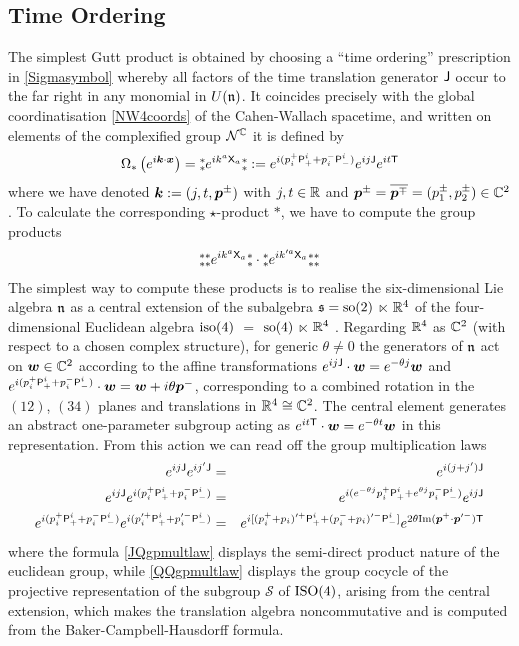 \subsection{Time Ordering}
\label{TOP}

The simplest Gutt product is obtained by choosing a ``time ordering''
prescription in \eqref{Sigmasymbol} whereby all factors of the time translation
generator ${\sf J}$ occur to the far right in any monomial in $U({\mathfrak n})$. It coincides
precisely with the global coordinatisation \eqref{NW4coords} of the
Cahen-Wallach spacetime, and written on elements of the complexified group
$\mathcal{N}^{\mathbb C}$ it is defined by
\begin{equation}
  \label{eq:time:defn}
  \Omega_*\left( e^{ i{{\boldsymbol {k} }}\cdot{{\boldsymbol {x} }}}\right)=
  \mbox{$\substack{\ast\\\ast}$}  e^{ i k^a {\sf X}_a} \mbox{$\substack{\ast\\\ast}$}:= e^{ i(p_i^+ {\sf P}^i_+
    +p_i^- {\sf P}^i_-)}  e^{ i j {\sf J}}  e^{ i t {\sf T}}
\end{equation}
where we have denoted ${{\boldsymbol {k} }}:=(j,t,{{\boldsymbol {p} }}^\pm)$ with $j,t\in{\mathbb R}$ and
${{\boldsymbol {p} }}^\pm=\overline{{{\boldsymbol {p} }}^\mp}=(p_1^\pm,p_2^\pm)\in{\mathbb C}^2$. To calculate the
corresponding $\star$-product $*$, we have to compute the group products
\begin{eqnarray}
  \label{TOgpprods}
  \mbox{$\substack{\ast\\\ast}$}  \mbox{$\substack{\ast\\\ast}$}  e^{ i k^a {\sf X}_a} \mbox{$\substack{\ast\\\ast}$}\cdot\mbox{$\substack{\ast\\\ast}$}  e^{ i k^{\prime a} {\sf X}_a}
  \mbox{$\substack{\ast\\\ast}$}  \mbox{$\substack{\ast\\\ast}$}
\end{eqnarray}
The simplest way to compute these products is to realise the six-dimensional Lie
algebra ${\mathfrak n}$ as a central extension of the subalgebra ${\mathfrak s}={\rm so}(2)$
$\ltimes$ ${\mathbb R}^4$ of the four-di\-mensional Euclidean algebra ${\rm iso}(4)$ $=$
${\rm so}(4)$ $\ltimes$ ${\mathbb R}^4$ \cite{SF1,FS1}. Regarding ${\mathbb R}^4$ as ${\mathbb C}^2$ (with
respect to a chosen complex structure), for generic $\theta\neq0$ the generators
of ${\mathfrak n}$ act on ${{\boldsymbol {w} }}\in{\mathbb C}^2$ according to the affine transformations $ e^{ i j
  {\sf J}}\cdot{{\boldsymbol {w} }}= e^{-\theta j} {{\boldsymbol {w} }}$ and $ e^{ i(p_i^+ {\sf P}^i_++p_i^-
  {\sf P}^i_-)}\cdot{{\boldsymbol {w} }}={{\boldsymbol {w} }}+ i\theta {{\boldsymbol {p} }}^-$, corresponding to a combined rotation in
the $(12)$, $(34)$ planes and translations in ${\mathbb R}^4\cong{\mathbb C}^2$. The central
element generates an abstract one-parameter subgroup acting as $ e^{ i t
  {\sf T}}\cdot{{\boldsymbol {w} }}= e^{-\theta t} {{\boldsymbol {w} }}$ in this representation. From this action we
can read off the group multiplication laws
\begin{eqnarray}
  \label{JJgpmultlaw}
  e^{ i j {\sf J}}  e^{ i j' {\sf J}}&=& e^{ i(j+j' ) {\sf J}}
  \\\label{JQgpmultlaw}
  e^{ i j {\sf J}}  e^{ i(p_i^+ {\sf P}^i_++p_i^- {\sf P}^i_-)}
  &=& e^{ i(  e^{-\theta j} p_i^+ {\sf P}^i_+ +e^{\theta j} p_i^- {\sf P}^i_-)}e^{ ij{\sf J}}
  \\\label{QQgpmultlaw}
  e^{ i(p_i^+ {\sf P}^i_++p_i^- {\sf P}^i_-)}e^{ i(p_i^{\prime +} {\sf P}^i_++p_i^{\prime -} {\sf P}^i_-)} 
  &=& e^{ i[(p_i^++p_i)^{\prime +} {\sf P}^i_+ +(p_i^-+p_i)^{\prime -} {\sf P}^i_-]}
  e^{2\theta {\rm Im}({{\boldsymbol {p} }}^+\cdot{{\boldsymbol {p} }}^{\prime -}) {\sf T}}
\end{eqnarray}
where the formula \eqref{JQgpmultlaw} displays the semi-direct product nature of
the euclidean group, while \eqref{QQgpmultlaw} displays the group cocycle of the
projective representation of the subgroup $\mathcal S$ of ${\rm ISO}(4)$,
arising from the central extension, which makes the translation algebra
noncommutative and is computed from the Baker-Campbell-Hausdorff formula.

